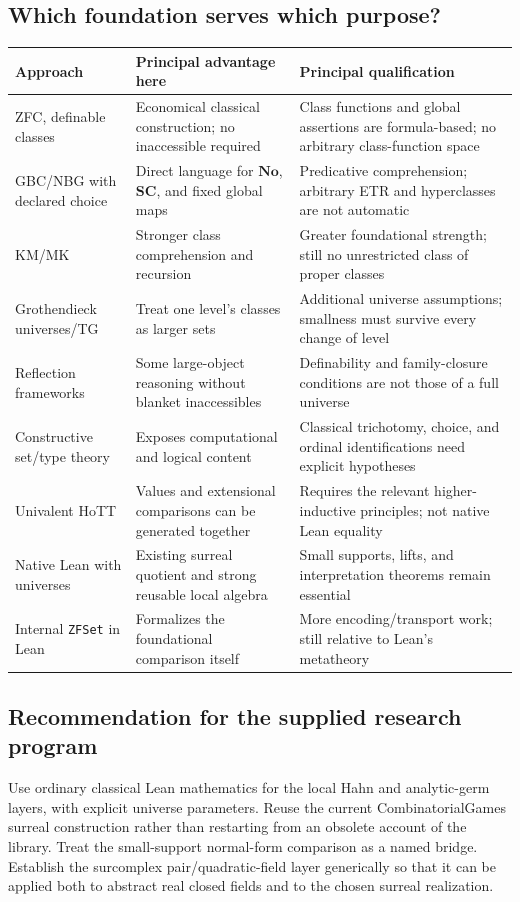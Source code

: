 \documentclass[11pt,letterpaper]{article}
\theoremstyle{definition}
\theoremstyle{remark}
\newcommand{\No}{\mathbf{No}}
\newcommand{\SC}{\mathbf{SC}}
\numberwithin{equation}{section}
\begin{document}
\subsection{Which foundation serves which purpose?}
\begin{longtable}{@{}L{0.22\textwidth}L{0.36\textwidth}L{0.34\textwidth}@{}}
\toprule
Approach & Principal advantage here & Principal qualification\\
\midrule\endhead
ZFC, definable classes & Economical classical construction; no inaccessible required & Class functions and global assertions are formula-based; no arbitrary class-function space\\[0.35em]
GBC/NBG with declared choice & Direct language for \(\No\), \(\SC\), and fixed global maps & Predicative comprehension; arbitrary ETR and hyperclasses are not automatic\\[0.35em]
KM/MK & Stronger class comprehension and recursion & Greater foundational strength; still no unrestricted class of proper classes\\[0.35em]
Grothendieck universes/TG & Treat one level's classes as larger sets & Additional universe assumptions; smallness must survive every change of level\\[0.35em]
Reflection frameworks & Some large-object reasoning without blanket inaccessibles & Definability and family-closure conditions are not those of a full universe\\[0.35em]
Constructive set/type theory & Exposes computational and logical content & Classical trichotomy, choice, and ordinal identifications need explicit hypotheses\\[0.35em]
Univalent HoTT & Values and extensional comparisons can be generated together & Requires the relevant higher-inductive principles; not native Lean equality\\[0.35em]
Native Lean with universes & Existing surreal quotient and strong reusable local algebra & Small supports, lifts, and interpretation theorems remain essential\\[0.35em]
Internal \texttt{ZFSet} in Lean & Formalizes the foundational comparison itself & More encoding/transport work; still relative to Lean's metatheory\\
\bottomrule
\end{longtable}

\subsection{Recommendation for the supplied research program}
Use ordinary classical Lean mathematics for the local Hahn and analytic-germ layers, with explicit universe parameters. Reuse the current CombinatorialGames surreal construction rather than restarting from an obsolete account of the library. Treat the small-support normal-form comparison as a named bridge. Establish the surcomplex pair/quadratic-field layer generically so that it can be applied both to abstract real closed fields and to the chosen surreal realization.
\end{document}

